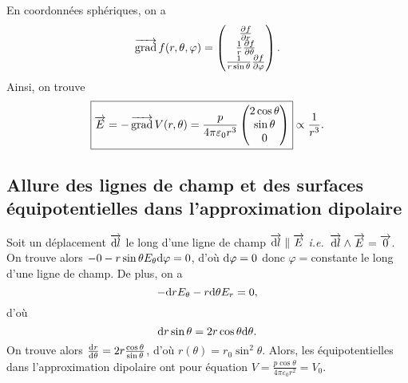 En coordonnées sphériques, on a 
\begin{equation}
    \operatorname{\overrightarrow{\text{grad}}} f(r,\theta,\varphi)=\begin{pmatrix}
        \frac{\partial f}{\partial r}\\\frac{1}{r}\frac{\partial f}{\partial \theta}\\\frac{1}{r\sin\theta}\frac{\partial f}{\partial\varphi}
    \end{pmatrix}.
\end{equation}
Ainsi, on trouve
\begin{equation}
    \boxed{
        \protect\overrightarrow{{E}}=-\operatorname{\overrightarrow{\text{grad}}} V(r,\theta)=\frac{p}{4\pi\varepsilon_0 r^{3}}\begin{pmatrix}
            2\cos\theta\\\sin\theta\\0
        \end{pmatrix}
    }\propto\frac{1}{r^{3}}.
\end{equation}

\subsection{Allure des lignes de champ et des surfaces équipotentielles dans l'approximation dipolaire}

Soit un déplacement $\protect\overrightarrow{{\mathrm{d} l}}$ le long d'une ligne de champ $\protect\overrightarrow{{\mathrm{d} l}}\parallel\protect\overrightarrow{{E}}$ \emph{i.e.~}$\protect\overrightarrow{{\mathrm{d} l}}\wedge\protect\overrightarrow{{E}}=\protect\overrightarrow{{0}}$. On trouve alors $-0-r\sin\theta E_{\theta}\mathrm{d}\varphi=0$, d'où $\mathrm{d}\varphi=0$ donc $\varphi=$constante le long d'une ligne de champ. De plus, on a 
\begin{equation}
    -\mathrm{d} rE_{\theta}-r\mathrm{d}\theta E_r=0,
\end{equation}
d'où
\begin{equation}
    \mathrm{d} r\sin\theta=2r\cos\theta\mathrm{d}\theta.
\end{equation}
On trouve alors $\frac{\mathrm{d} r}{\mathrm{d}\theta}=2r\frac{\cos\theta}{\sin\theta}$, d'où $r(\theta)=r_0\sin^{2}\theta$. Alors, les équipotentielles dans l'approximation dipolaire ont pour équation $V=\frac{p\cos\theta}{4\pi\varepsilon_0 r^{2}}=V_0$.